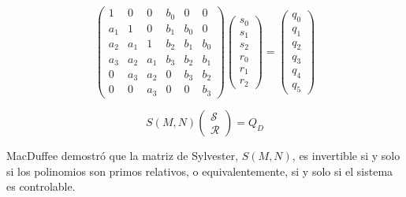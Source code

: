             \begin{equation*}
                \begin{pmatrix}
                    1 & 0 & 0 & b_{0} & 0 & 0 \\
                    a_{1} & 1 & 0 & b_{1} & b_{0} & 0 \\
                    a_{2} & a_{1} & 1 & b_{2} & b_{1} & b_{0} \\
                    a_{3} & a_{2} & a_{1} & b_{3} & b_{2} & b_{1} \\
                    0 & a_{3} & a_{2} & 0 & b_{3} & b_{2} \\
                    0 & 0 & a_{3} & 0 & 0 & b_{3}
                \end{pmatrix}
                \begin{pmatrix}
                    s_0 \\
                    s_1 \\
                    s_2 \\
                    r_0 \\
                    r_1 \\
                    r_2
                \end{pmatrix} =
                \begin{pmatrix}
                    q_0 \\
                    q_1 \\
                    q_2 \\
                    q_3 \\
                    q_4 \\
                    q_5
                \end{pmatrix}
            \end{equation*}

            \begin{equation} \label{eq:anillos7}
                S(M, N)
                \begin{pmatrix}
                    \mathcal{S} \\
                    \mathcal{R}
                \end{pmatrix} =
                Q_D
            \end{equation}

            MacDuffee demostró que la matriz de Sylvester, $S(M, N)$, es invertible si y solo si los polinomios son primos relativos, o equivalentemente, si y solo si el sistema es controlable.

